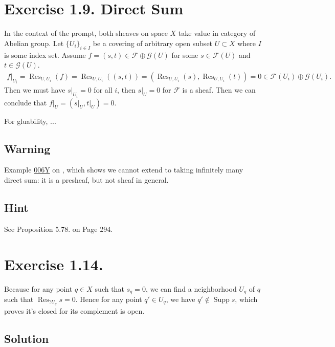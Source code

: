 \section{Exercise 1.9. Direct Sum}\label{Hart Ex 1.9.}

In the context of the prompt, both sheaves on space $X$ take value in category of Abelian group. Let $\{U_i\}_{i\in I}$ be a covering of arbitrary open subset $U\subset X$ where $I$ is some index set. Assume $f=(s,t)\in \mathscr F\oplus\mathscr G(U)$ for some $s\in\mathscr F(U)$ and $t\in\mathscr G(U)$. 
\begin{align*}
    f\vert_{U_i}=\operatorname{Res}_{U,U_i}(f)=\operatorname{Res}_{U,U_i}((s,t))=(\operatorname{Res}_{U,U_i}(s),\operatorname{Res}_{U,U_i}(t))=0\in \mathscr F(U_i)\oplus\mathscr G(U_i).
\end{align*}
Then we must have $s\vert_{U_i}=0$ for all $i$, then $s\vert_U=0$ for $\mathscr F$ is a sheaf. Then we can conclude that $f\vert_{U}=(s\vert_U,t\vert_U)=0$.

For gluability, ...

\subsection{Warning}

Example \href{https://stacks.math.columbia.edu/tag/006Y}{006Y} on \cite{stacks-project}, which shows we cannot extend to taking infinitely many direct sum: it is a presheaf, but not sheaf in general.

\subsection{Hint}

See \cite{rotman2009introduction} Proposition 5.78. on Page 294.

\section{Exercise 1.14.}\label{Hart Chap 2 Ex 1.14.}

Because for any point $q\in X$ such that $s_q=0$, we can find a neighborhood $U_q$ of $q$ such that $\operatorname{Res}_{?U_q}s=0$. Hence for any point $q'\in U_q$, we have $q'\notin \operatorname{Supp} s$, which proves it's closed for its complement is open.

\subsection{Solution}

